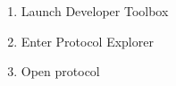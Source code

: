\begin{enumerate}
\item Launch Developer Toolbox
  \begin{figure}[!ht]
    \centering
  \end{figure}
\item Enter Protocol Explorer
  \begin{figure}[!ht]
    \centering
  \end{figure}
  \pagebreak
\item Open protocol
  \begin{figure}[!ht]
    \centering
\end{figure}
\end{enumerate}
